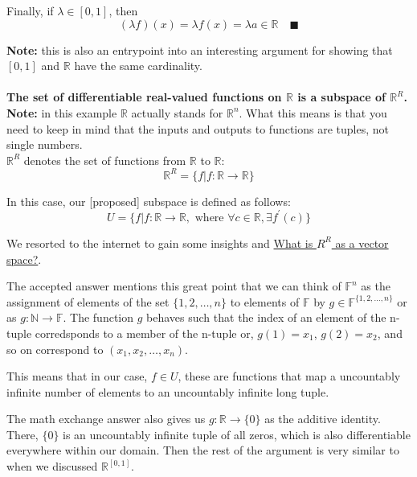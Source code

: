 Finally, if $\lambda \in [0,1]$, then
$$
( \lambda f )(x) = \lambda f(x) = \lambda a \in \mathbb{R} \quad \blacksquare
$$

\textbf{Note:} this is also an entrypoint into an interesting argument for showing that
$[0,1]$ and $\mathbb{R}$ have the same cardinality.
\\~\\




\textbf{The set of differentiable real-valued functions on $\mathbb{R}$ is a subspace of $\mathbb{R}^R$.}
\\

\textbf{Note:} in this example $\mathbb{R}$ actually stands for $\mathbb{R}^n$. What this means is
that you need to keep in mind that the inputs and outputs to functions are tuples, not single numbers.
\\

$\mathbb{R}^R$ denotes the set of functions from $\mathbb{R}$ to $\mathbb{R}$:
$$
\mathbb{R}^R = \{ f | f:\mathbb{R} \rightarrow \mathbb{R} \}
$$

In this case, our [proposed] subspace is defined as follows:
$$
U = \{ f | f:\mathbb{R} \rightarrow \mathbb{R}, \text{ where } \forall c\in\mathbb{R}, \exists f^\prime (c) \}
$$

We resorted to the internet to gain some insights and
\href{https://math.stackexchange.com/questions/1592249/what-is-mathbb-r-mathbb-r-as-a-vector-space}{What is $R^R$ as a vector space?}.

The accepted answer mentions this great point that we can think of $\mathbb{F}^n$ as the
assignment of elements of the set $\{1, 2, \ldots , n\}$ to elements of $\mathbb{F}$
by $g \in \mathbb{F}^{ \{1,2,\ldots , n\} }$ or as $g : \mathbb{N} \rightarrow \mathbb{F}$.
The function $g$ behaves such that the index of an element of the n-tuple corredsponds to a member of
the n-tuple or, $g(1)=x_1$, $g(2)=x_2$, and so on correspond to $(x_1, x_2, \ldots , x_n)$.

This means that in our case, $f\in U$, these are functions that map a uncountably infinite number
of elements to an uncountably infinite long tuple.

The math exchange answer also gives us $g: \mathbb{R}\rightarrow \{0\}$ as the additive identity.
There, $\{0\}$ is an uncountably infinite tuple of all zeros, which is also differentiable everywhere
within our domain.
Then the rest of the argument is very similar to when we discussed $\mathbb{R}^{[0,1]}$.
\\~\\